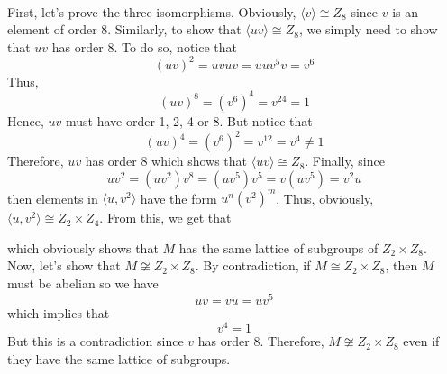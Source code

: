 \begin{solution}
    \\ First, let's prove the three isomorphisms. Obviously, $\langle v \rangle \cong Z_8$ since $v$ is an element of order 8. Similarly, to show that $\langle uv \rangle \cong Z_8$, we simply need to show that $uv$ has order 8. To do so, notice that 
    $$(uv)^2 = uvuv = uuv^5v = v^6$$
    Thus,
    $$(uv)^8 = (v^6)^4 = v^{24} = 1$$
    Hence, $uv$ must have order 1, 2, 4 or 8. But notice that
    $$(uv)^4 = (v^6)^2 = v^12 = v^4 \neq 1$$
    Therefore, $uv$ has order 8 which shows that $\langle uv \rangle \cong Z_8$. Finally, since
    $$uv^2 = (uv^2)v^8 = (uv^5)v^5 = v(uv^5) = v^2u$$
    then elements in $\langle u, v^2 \rangle$ have the form $u^n(v^2)^m$. Thus, obviously, $\langle u, v^2 \rangle \cong Z_2\times Z_4$. From this, we get that
    \begin{center}
    \end{center}
    which obviously shows that $M$ has the same lattice of subgroups of $Z_2 \times Z_8$.\\
    Now, let's show that $M \not\cong Z_2 \times Z_8$. By contradiction, if $M \cong Z_2 \times Z_8$, then $M$ must be abelian so we have 
    $$uv = vu = uv^5$$
    which implies that 
    $$v^4 = 1$$
    But this is a contradiction since $v$ has order 8. Therefore, $M \not\cong Z_2 \times Z_8$ even if they have the same lattice of subgroups. \\
\end{solution}

